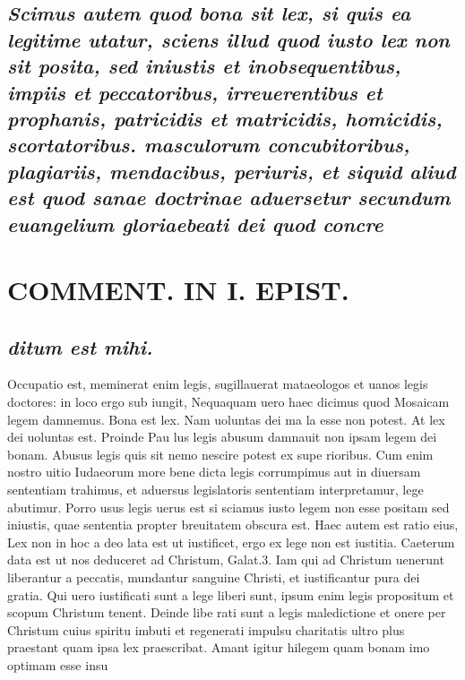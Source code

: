 \documentclass{article}
\begin{document}
\begin{pages}
\subsection*{\textit{Scimus autem quod bona sit lex, si quis ea legitime utatur, sciens illud quod iusto lex non sit posita, sed iniustis et inobsequentibus, impiis et peccatoribus, irreuerentibus et prophanis, patricidis et matricidis, homicidis, scortatoribus. masculorum concubitoribus, plagiariis, mendacibus, periuris, et siquid aliud est quod sanae doctrinae aduersetur secundum euangelium gloriaebeati dei quod concre}}
\section*{COMMENT. IN I. EPIST. }
{}
\subsection*{\textit{ditum est mihi. }}\pstart Occupatio est, meminerat enim legis, sugillauerat mataeologos et uanos legis doctores: in loco ergo sub iungit, Nequaquam uero haec dicimus quod Mosaicam legem damnemus. Bona est lex. Nam uoluntas dei ma la esse non potest. At lex dei uoluntas est. Proinde Pau lus legis abusum damnauit non ipsam legem dei bonam. Abusus legis quis sit nemo nescire potest ex supe rioribus. Cum enim nostro uitio Iudaeorum more bene dicta legis corrumpimus aut in diuersam sententiam trahimus, et aduersus legislatoris sententiam interpretamur, lege abutimur. Porro usus legis uerus est si sciamus iusto legem non esse positam sed iniustis, quae sententia propter breuitatem obscura est. Haec autem est ratio eius, Lex non in hoc a deo lata est ut iustificet, ergo ex lege non est iustitia. Caeterum data est ut nos deduceret ad Christum, Galat.3. Iam qui ad Christum uenerunt liberantur a peccatis, mundantur sanguine Christi, et iustificantur pura dei gratia. Qui uero iustificati sunt a lege liberi sunt, ipsum enim legis propositum et scopum Christum tenent. Deinde libe rati sunt a legis maledictione et onere per Christum cuius spiritu imbuti et regenerati impulsu charitatis ultro plus praestant quam ipsa lex praescribat. Amant igitur hilegem quam bonam imo optimam esse insu\pend

\end{pages}
\end{document}
